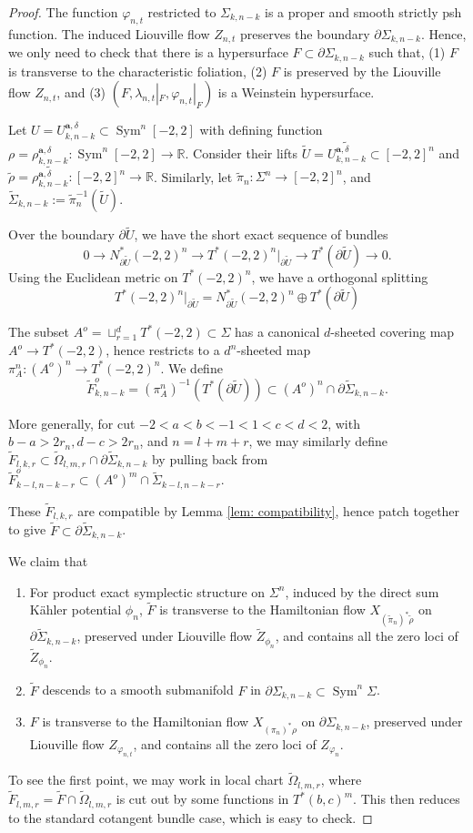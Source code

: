 \documentclass{article}
\def\R{\mathbb{R}}
\def\In{\subset}
\def\d{\partial}
\def\wt{\widetilde}
\DeclareMathOperator{\Sym}{Sym}
\def\ba{\mathbf{a}} %
\theoremstyle{definition}
\begin{document}
\begin{proof}
The function $\varphi_{n,t}$ restricted to $\Sigma_{k,n-k}$ is a proper and smooth strictly psh function. The induced Liouville flow $Z_{n,t}$ preserves the boundary $\d \Sigma_{k,n-k}$. Hence, we only need to check that there is a hypersurface $F \In \d \Sigma_{k,n-k}$ such that, (1) $F$ is transverse to the characteristic foliation, (2) $F$ is preserved by the Liouville flow $Z_{n,t}$, and (3) $(F, \lambda_{n,t}|_F, \varphi_{n,t}|_F)$ is a Weinstein hypersurface. 

Let $U=U_{k,n-k}^{\ba, \delta} \In \Sym^n [-2,2]$ with defining function $\rho = \rho_{k,n-k}^{\ba, \delta}: \Sym^n[-2,2] \to \R$. Consider their  lifts $\wt U = \wt {U^{\ba, \delta}_{k,n-k}} \In [-2,2]^n$ and $\wt \rho = \wt {\rho^{\ba, \delta}_{k,n-k}}: [-2,2]^n \to \R$. Similarly, let $\wt \pi_n: \Sigma^n \to [-2,2]^n$, and $\wt \Sigma_{k,n-k}:= \wt \pi_n^{-1}(\wt U)$. 

Over the boundary $\d \wt U$, we have the short exact sequence of bundles
$$ 0 \to N^*_{\d \wt U} (-2,2)^n \to T^*(-2,2)^n|_{\d \wt U} \to T^* (\d \wt U) \to 0 . $$
Using the Euclidean metric on $T^*(-2,2)^n$, we have a orthogonal splitting 
$$ T^*(-2,2)^n|_{\d \wt U} = N^*_{\d \wt U} (-2,2)^n \oplus T^* (\d \wt U)$$

The subset $A^o = \sqcup_{r=1}^d T^*(-2,2) \In \Sigma$ has a canonical $d$-sheeted covering map $A^o \to T^*(-2,2)$, hence restricts to a $d^n$-sheeted map $\pi^n_A: (A^o)^n \to T^*(-2,2)^n$. We define 
$$ \wt F^o_{k,n-k} = (\pi^n_A)^{-1}(T^* (\d \wt U)) \In (A^o)^n \cap \d \wt \Sigma_{k,n-k}. $$


More generally, for cut $-2 < a < b < -1 < 1 < c < d < 2$, with $b-a > 2r_n, d-c>2r_n$, and $n=l+m+r$, we may similarly define $\wt F_{l, k, r} \In \wt \Omega_{l,m,r} \cap \d \wt \Sigma_{k,n-k}$ by pulling back from $\wt F^o_{k-l, n-k-r} \In (A^o)^m \cap \wt \Sigma_{k-l, n-k-r}$.

These $\wt F_{l,k,r}$ are compatible by Lemma \ref{lem: compatibility}, hence patch together to give $\wt F \In \d \wt \Sigma_{k, n-k}$. 

We claim that
\begin{enumerate}
    \item For product exact symplectic structure on $\Sigma^n$, induced by the direct sum K\"ahler potential $\phi_n$, $\wt F$ is transverse to the Hamiltonian flow $X_{(\wt \pi_n)^*\wt \rho}$ on $\d \wt \Sigma_{k,n-k}$,  preserved under Liouville flow $\wt Z_{\phi_n}$, and contains all the zero loci of $\wt Z_{\phi_n}$.  
    \item $\wt F$ descends to a smooth submanifold $F$ in $\d \Sigma_{k,n-k} \In \Sym^n \Sigma$. 
    \item $F$ is transverse to the Hamiltonian flow $X_{( \pi_n)^* \rho}$ on $\d  \Sigma_{k,n-k}$,  preserved under Liouville flow $ Z_{\varphi_{n,t}}$, and contains all the zero loci of $Z_{\varphi_n}$. 
\end{enumerate}
To see the first point, we may work in local chart $\wt \Omega_{l,m,r}$, where $\wt F_{l,m,r} = \wt F \cap \wt \Omega_{l,m,r}$ is cut out by some functions in $T^*(b,c)^m$. This then reduces to the standard cotangent bundle case, which is easy to check. 


\end{proof}
\end{document}

